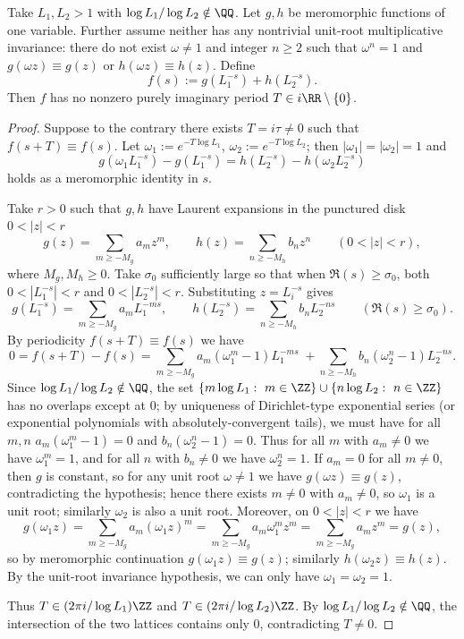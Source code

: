 \begin{theorem}\label{thm:xi-two-base-deperiodization-no-imag-period}
Take \(L_1,L_2>1\) with \(\log L_1/\log L_2\notin\QQ\).
Let \(g,h\) be meromorphic functions of one variable.
Further assume neither has any nontrivial unit-root multiplicative invariance: there do not exist \(\omega\neq 1\) and integer \(n\ge 2\) such that \(\omega^n=1\) and \(g(\omega z)\equiv g(z)\) or \(h(\omega z)\equiv h(z)\).
Define
\[
f(s):=g(L_1^{-s})+h(L_2^{-s}).
\]
Then \(f\) has no nonzero purely imaginary period \(T\in i\RR\setminus\{0\}\).
\end{theorem}

\begin{proof}
Suppose to the contrary there exists \(T=i\tau\neq 0\) such that \(f(s+T)\equiv f(s)\).
Let \(\omega_1:=e^{-T\log L_1}\), \(\omega_2:=e^{-T\log L_2}\); then \(|\omega_1|=|\omega_2|=1\) and
\[
g(\omega_1 L_1^{-s})-g(L_1^{-s})=h(L_2^{-s})-h(\omega_2 L_2^{-s})
\]
holds as a meromorphic identity in \(s\).
\par
Take \(r>0\) such that \(g,h\) have Laurent expansions in the punctured disk \(0<|z|<r\)
\[
g(z)=\sum_{m\ge -M_g} a_m z^m,\qquad
h(z)=\sum_{n\ge -M_h} b_n z^n
\qquad(0<|z|<r),
\]
where \(M_g,M_h\ge 0\).
Take \(\sigma_0\) sufficiently large so that when \(\Re(s)\ge \sigma_0\), both \(0<|L_1^{-s}|<r\) and \(0<|L_2^{-s}|<r\).
Substituting \(z=L_i^{-s}\) gives
\[
g(L_1^{-s})=\sum_{m\ge -M_g} a_m L_1^{-ms},\qquad
h(L_2^{-s})=\sum_{n\ge -M_h} b_n L_2^{-ns}
\qquad(\Re(s)\ge \sigma_0).
\]
By periodicity \(f(s+T)\equiv f(s)\) we have
\[
0=f(s+T)-f(s)
=\sum_{m\ge -M_g} a_m(\omega_1^m-1)L_1^{-ms}
\;+\sum_{n\ge -M_h} b_n(\omega_2^n-1)L_2^{-ns}.
\]
Since \(\log L_1/\log L_2\notin\QQ\), the set \(\{m\log L_1:\ m\in\ZZ\}\cup\{n\log L_2:\ n\in\ZZ\}\) has no overlaps except at \(0\);
by uniqueness of Dirichlet-type exponential series (or exponential polynomials with absolutely-convergent tails), we must have for all \(m,n\)
\(
a_m(\omega_1^m-1)=0
\) and
\(
b_n(\omega_2^n-1)=0
\).
Thus for all \(m\) with \(a_m\neq 0\) we have \(\omega_1^m=1\), and for all \(n\) with \(b_n\neq 0\) we have \(\omega_2^n=1\).
If \(a_m=0\) for all \(m\neq 0\), then \(g\) is constant, so for any unit root \(\omega\neq 1\) we have \(g(\omega z)\equiv g(z)\), contradicting the hypothesis;
hence there exists \(m\neq 0\) with \(a_m\neq 0\), so \(\omega_1\) is a unit root; similarly \(\omega_2\) is also a unit root.
Moreover, on \(0<|z|<r\) we have
\[
g(\omega_1 z)
=\sum_{m\ge -M_g} a_m(\omega_1 z)^m
=\sum_{m\ge -M_g} a_m\omega_1^m z^m
=\sum_{m\ge -M_g} a_m z^m
=g(z),
\]
so by meromorphic continuation \(g(\omega_1 z)\equiv g(z)\);
similarly \(h(\omega_2 z)\equiv h(z)\).
By the unit-root invariance hypothesis, we can only have \(\omega_1=\omega_2=1\).
\par
Thus \(T\in (2\pi i/\log L_1)\ZZ\) and \(T\in (2\pi i/\log L_2)\ZZ\).
By \(\log L_1/\log L_2\notin\QQ\), the intersection of the two lattices contains only \(0\), contradicting \(T\neq 0\).
\end{proof}

